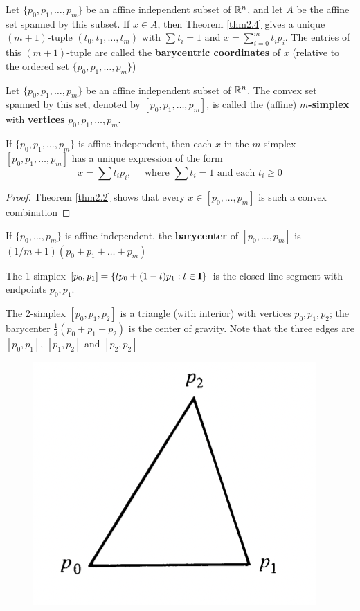 \documentclass[11pt]{article}
\begin{document}
\begin{definition}[]
Let \(\{p_0,p_1,\dots,p_m\}\) be an affine independent subset of \(\mathbb{R}^n\), and let \(A\) be the affine set
spanned by this subset. If \(x\in A\), then Theorem \ref{thm2.4} gives a
unique \((m+1)\)-tuple \((t_0,t_1,\dots,t_m)\) with \(\sum t_i=1\) and \(x=\sum_{i=0}^mt_ip_i\). The entries of
this \((m+1)\)-tuple are called the \textbf{barycentric coordinates} of \(x\) (relative to the ordered set
\(\{p_0,p_1,\dots,p_m\}\))
\end{definition}

\begin{definition}[]
Let \(\{p_0,p_1,\dots,p_m\}\) be an affine independent subset of \(\mathbb{R}^n\). The convex set spanned by this
set, denoted by \([p_0,p_1,\dots,p_m]\), is called the (affine) \textbf{\(m\)-simplex} with \textbf{vertices} \(p_0,p_1,\dots,p_m\).
\end{definition}

\begin{theorem}[]
If \(\{p_0,p_1,\dots,p_m\}\) is affine independent, then each \(x\) in
the \(m\)-simplex \([p_0,p_1,\dots,p_m]\) has a unique expression of the form
\begin{equation*}
x=\sum t_ip_i,\quad\text{ where }\sum t_i=1\text{ and each }t_i\ge 0
\end{equation*}
\end{theorem}

\begin{proof}
Theorem \ref{thm2.2} shows that every \(x\in[p_0,\dots,p_m]\) is such a convex combination
\end{proof}

\begin{definition}[]
If \(\{p_0,\dots,p_m\}\) is affine independent, the \textbf{barycenter} of \([p_0,\dots,p_m]\) is \((1/m+1)(p_0+p_1+\dots+p_m)\)
\end{definition}

\begin{examplle}[]
The 1-simplex \([p_0,p_1]=\{t p_0+(1-t)p_1:t\in\operatorname{\textbf{I}}\}\) is the closed line segment with
endpoints \(p_0,p_1\).
\end{examplle}

\begin{examplle}[]
The 2-simplex \([p_0,p_1,p_2]\) is a triangle (with interior) with vertices \(p_0,p_1,p_2\); the
barycenter \(\frac{1}{3}(p_0+p_1+p_2)\) is the center of gravity.  Note that the three edges
are \([p_0,p_1]\), \([p_1,p_2]\) and \([p_2,p_2]\)
\begin{figure}[htbp]
\centering
\includegraphics[width=.3\textwidth]{../images/AnIntroductionToAlgebraicTopology/5.png}
\label{}
\end{figure}
\end{examplle}
\end{document}
